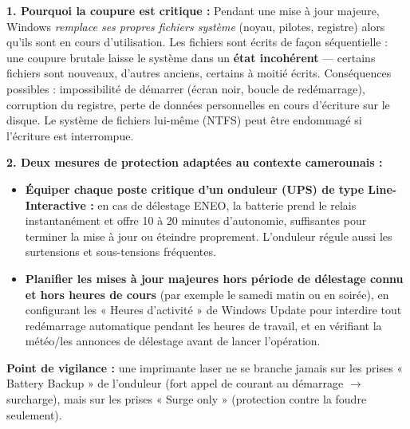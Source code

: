 \documentclass[11pt]{article}
\begin{document}
\begin{corrige}
\textbf{1. Pourquoi la coupure est critique :}
Pendant une mise à jour majeure, Windows \emph{remplace ses propres fichiers système} (noyau, pilotes, registre) alors qu'ils sont en cours d'utilisation. Les fichiers sont écrits de façon séquentielle : une coupure brutale laisse le système dans un \textbf{état incohérent} — certains fichiers sont nouveaux, d'autres anciens, certains à moitié écrits. Conséquences possibles : impossibilité de démarrer (écran noir, boucle de redémarrage), corruption du registre, perte de données personnelles en cours d'écriture sur le disque. Le système de fichiers lui-même (NTFS) peut être endommagé si l'écriture est interrompue.

\textbf{2. Deux mesures de protection adaptées au contexte camerounais :}
\begin{itemize}
    \item \textbf{Équiper chaque poste critique d'un onduleur (UPS) de type Line-Interactive :} en cas de délestage ENEO, la batterie prend le relais instantanément et offre 10 à 20 minutes d'autonomie, suffisantes pour terminer la mise à jour ou éteindre proprement. L'onduleur régule aussi les surtensions et sous-tensions fréquentes.
    \item \textbf{Planifier les mises à jour majeures hors période de délestage connu et hors heures de cours} (par exemple le samedi matin ou en soirée), en configurant les « Heures d'activité » de Windows Update pour interdire tout redémarrage automatique pendant les heures de travail, et en vérifiant la météo/les annonces de délestage avant de lancer l'opération.
\end{itemize}

\textbf{Point de vigilance :} une imprimante laser ne se branche jamais sur les prises « Battery Backup » de l'onduleur (fort appel de courant au démarrage $\to$ surcharge), mais sur les prises « Surge only » (protection contre la foudre seulement).
\end{corrige}
\end{document}

